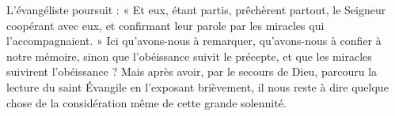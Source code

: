 L’évangéliste poursuit : « Et eux, étant partis, prêchèrent partout, le Seigneur coopérant avec eux, et confirmant leur parole par les miracles qui l’accompagnaient. » Ici qu’avons-nous à remarquer, qu’avons-nous à confier à notre mémoire, sinon que l’obéissance suivit le précepte, et que les miracles suivirent l’obéissance ? Mais après avoir, par le secours de Dieu, parcouru la lecture du saint Évangile en l’exposant brièvement, il nous reste à dire quelque chose de la considération même de cette grande solennité.
